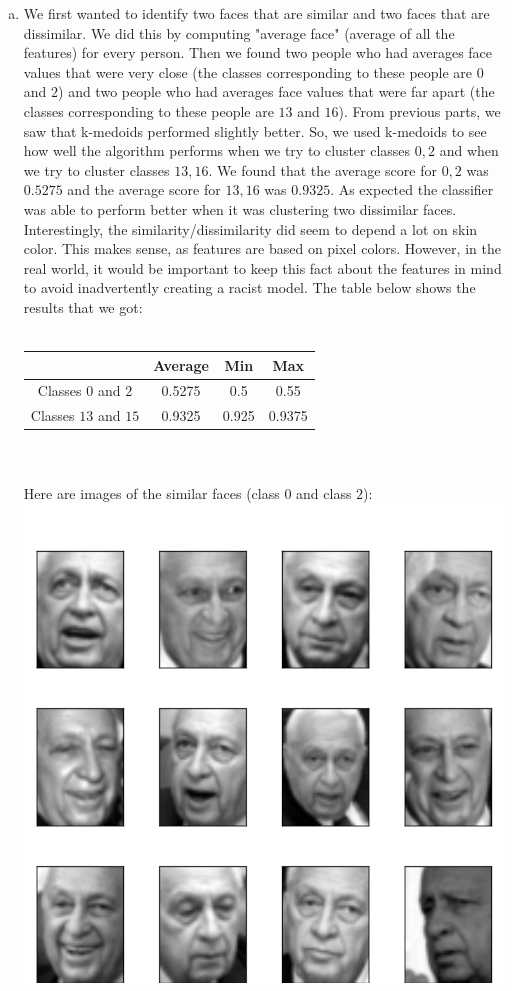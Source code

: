 \documentclass[11pt]{article}
\begin{document}
\begin{enumerate}[1]
\begin{enumerate}[(a)]
\item We first wanted to identify two faces that are similar and two faces that are dissimilar. We did this by computing "average face" (average of all the features) for every person. Then we found two people who had averages face values that were very close (the classes corresponding to these people are $0$ and $2$) and two people who had averages face values that were far apart (the classes corresponding to these people are $13$ and $16$). From previous parts, we saw that k-medoids performed slightly better. So, we used k-medoids to see how well the algorithm performs when we try to cluster classes $0,2$ and when we try to cluster classes $13,16$. We found that the average score for $0,2$ was $0.5275$ and the average score for $13, 16$ was $0.9325$. As expected the classifier was able to perform better when it was clustering two dissimilar faces. Interestingly, the similarity/dissimilarity did seem to depend a lot on skin color. This makes sense, as features are based on pixel colors. However, in the real world, it would be important to keep this fact about the features in mind to avoid inadvertently creating a racist model. The table below shows the results that we got: \\ \\
 \begin{tabular}{| c | c | c | c |}
  \hline		
   & Average & Min & Max \\
  \hline
  Classes $0$ and $2$ & 0.5275 & 0.5 & 0.55 \\
  Classes $13$ and $15$ & 0.9325 & 0.925 & 0.9375   \\
  \hline
\end{tabular}\\ \\
\newpage
Here are images of the similar faces (class $0$ and class $2$): \\
\includegraphics[scale=0.35]{plot0.png} \hspace*{5em}

\end{enumerate}
\end{enumerate}
\end{document}
